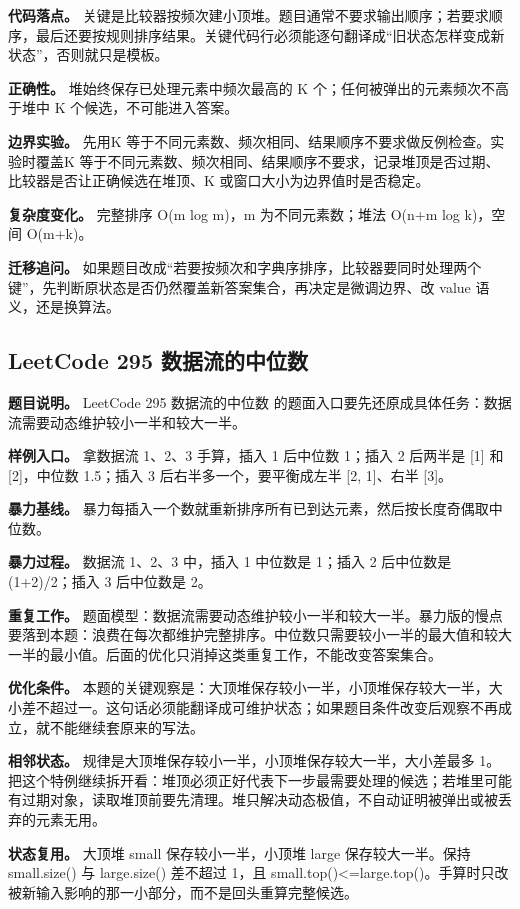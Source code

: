 \textbf{代码落点。} 关键是比较器按频次建小顶堆。题目通常不要求输出顺序；若要求顺序，最后还要按规则排序结果。关键代码行必须能逐句翻译成“旧状态怎样变成新状态”，否则就只是模板。

\textbf{正确性。} 堆始终保存已处理元素中频次最高的 K 个；任何被弹出的元素频次不高于堆中 K 个候选，不可能进入答案。

\textbf{边界实验。} 先用K 等于不同元素数、频次相同、结果顺序不要求做反例检查。实验时覆盖K 等于不同元素数、频次相同、结果顺序不要求，记录堆顶是否过期、比较器是否让正确候选在堆顶、K 或窗口大小为边界值时是否稳定。

\textbf{复杂度变化。} 完整排序 O(m log m)，m 为不同元素数；堆法 O(n+m log k)，空间 O(m+k)。

\textbf{迁移追问。} 如果题目改成“若要按频次和字典序排序，比较器要同时处理两个键”，先判断原状态是否仍然覆盖新答案集合，再决定是微调边界、改 value 语义，还是换算法。

\subsection{LeetCode 295 数据流的中位数}

\textbf{题目说明。} LeetCode 295 数据流的中位数 的题面入口要先还原成具体任务：数据流需要动态维护较小一半和较大一半。

\textbf{样例入口。} 拿数据流 1、2、3 手算，插入 1 后中位数 1；插入 2 后两半是 [1] 和 [2]，中位数 1.5；插入 3 后右半多一个，要平衡成左半 [2, 1]、右半 [3]。

\textbf{暴力基线。} 暴力每插入一个数就重新排序所有已到达元素，然后按长度奇偶取中位数。

\textbf{暴力过程。} 数据流 1、2、3 中，插入 1 中位数是 1；插入 2 后中位数是 (1+2)/2；插入 3 后中位数是 2。

\textbf{重复工作。} 题面模型：数据流需要动态维护较小一半和较大一半。暴力版的慢点要落到本题：浪费在每次都维护完整排序。中位数只需要较小一半的最大值和较大一半的最小值。后面的优化只消掉这类重复工作，不能改变答案集合。

\textbf{优化条件。} 本题的关键观察是：大顶堆保存较小一半，小顶堆保存较大一半，大小差不超过一。这句话必须能翻译成可维护状态；如果题目条件改变后观察不再成立，就不能继续套原来的写法。

\textbf{相邻状态。} 规律是大顶堆保存较小一半，小顶堆保存较大一半，大小差最多 1。把这个特例继续拆开看：堆顶必须正好代表下一步最需要处理的候选；若堆里可能有过期对象，读取堆顶前要先清理。堆只解决动态极值，不自动证明被弹出或被丢弃的元素无用。

\textbf{状态复用。} 大顶堆 small 保存较小一半，小顶堆 large 保存较大一半。保持 small.size() 与 large.size() 差不超过 1，且 small.top()<=large.top()。手算时只改被新输入影响的那一小部分，而不是回头重算完整候选。

